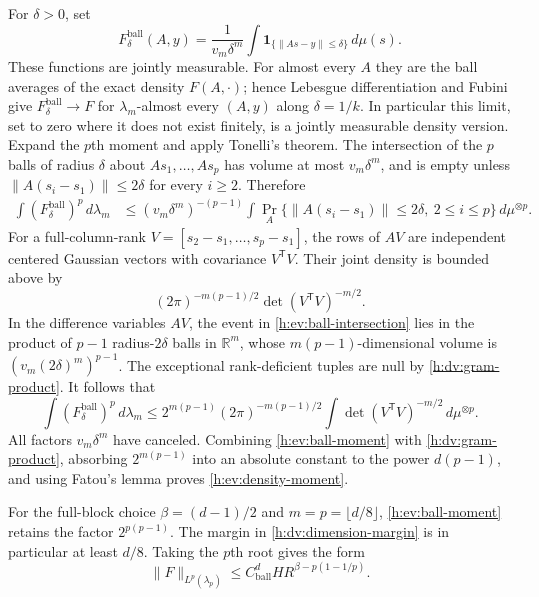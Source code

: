 For \(\delta>0\), set
\[
 F^{\mathrm{ball}}_\delta(A,y)
 =\frac{1}{v_m\delta^m}
   \int\mathbf 1_{\{\|As-y\|\le\delta\}}\,d\mu(s).
\]
These functions are jointly measurable.  For almost every \(A\) they
are the ball averages of the exact density \(F(A,\cdot)\); hence
Lebesgue differentiation and Fubini give
\(F^{\mathrm{ball}}_\delta\to F\) for \(\lambda_m\)-almost every
\((A,y)\) along \(\delta=1/k\).  In particular this limit, set to zero
where it does not exist finitely, is a jointly measurable density
version.  
Expand the \(p\)th moment and apply Tonelli's theorem.  The intersection
of the \(p\) balls of radius \(\delta\) about \(As_1,\ldots,As_p\) has
volume at most \(v_m\delta^m\), and is empty unless
\(\|A(s_i-s_1)\|\le2\delta\) for every \(i\ge2\).  Therefore
\begin{align}
 \int (F^{\mathrm{ball}}_\delta)^p\,d\lambda_m
 &\le (v_m\delta^m)^{-(p-1)}
 \int
 \Pr_A\{\|A(s_i-s_1)\|\le2\delta,\ 2\le i\le p\}
 \,d\mu^{\otimes p}.
 \label{h:ev:ball-intersection}
\end{align}
For a full-column-rank \(V=[s_2-s_1,\ldots,s_p-s_1]\), the rows of
\(AV\) are independent centered Gaussian vectors with covariance
\(V^{\mathsf T}V\).  Their joint density is bounded above by
\[
 (2\pi)^{-m(p-1)/2}\det(V^{\mathsf T}V)^{-m/2}.
\]
In the difference variables \(AV\), the event in
\eqref{h:ev:ball-intersection} lies in the product of \(p-1\)
radius-\(2\delta\) balls in \(\mathbb R^m\), whose
\(m(p-1)\)-dimensional volume is \((v_m(2\delta)^m)^{p-1}\).
The exceptional rank-deficient tuples are null by
\eqref{h:dv:gram-product}.  It follows that
\begin{equation}\label{h:ev:ball-moment}
 \int (F^{\mathrm{ball}}_\delta)^p\,d\lambda_m
 \le 2^{m(p-1)}(2\pi)^{-m(p-1)/2}
     \int\det(V^{\mathsf T}V)^{-m/2}\,d\mu^{\otimes p}.
\end{equation}
All factors \(v_m\delta^m\) have canceled.  Combining
\eqref{h:ev:ball-moment} with \eqref{h:dv:gram-product}, absorbing
\(2^{m(p-1)}\) into an absolute constant to the power \(d(p-1)\),
and using Fatou's lemma proves \eqref{h:ev:density-moment}.

For the full-block choice
\(\beta=(d-1)/2\) and \(m=p=\lfloor d/8\rfloor\),
\eqref{h:ev:ball-moment} retains the factor \(2^{p(p-1)}\).
The margin in \eqref{h:dv:dimension-margin} is in particular at least \(d/8\).
Taking the \(p\)th root gives the form
\begin{equation}\label{h:ev:half-sphere-density}
 \|F\|_{L^p(\lambda_p)}
 \le C_{\mathrm{ball}}^d H R^{\beta-p(1-1/p)}.
\end{equation}

